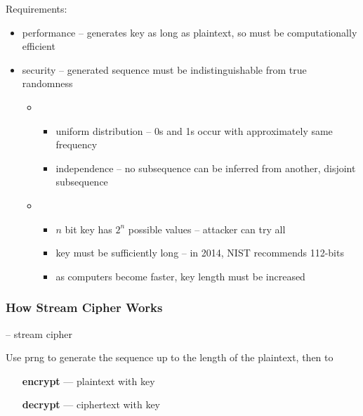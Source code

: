 \documentclass[draft]{article}
\begin{document}
Requirements:
\begin{itemize}[nosep]
    \item performance -- generates key as long as plaintext, so must be computationally efficient
    \item security -- generated sequence must be indistinguishable from true randomness
          \begin{itemize}
              \item {}
                    \begin{itemize}[nosep]
                        \item uniform distribution -- 0s and 1s occur with approximately same frequency
                        \item independence -- no subsequence can be inferred from another, disjoint subsequence
                    \end{itemize}
              \item {}
                    \begin{itemize}[nosep]
                        \item $n$ bit key has $2^n$ possible values -- attacker can try all
                        \item key must be sufficiently long -- in 2014, NIST recommends 112-bits
                        \item as computers become faster, key length must be increased
                    \end{itemize}
          \end{itemize}
\end{itemize}

\subsubsection*{How Stream Cipher Works}
 -- \glsdesc*{stream cipher}

Use \acrshort{prng} to generate the sequence up to the length of the plaintext, then to
\begin{itemize}[nosep, align=left, leftmargin=1in]
    \item[\textbf{encrypt} ---]  plaintext with key
    \item[\textbf{decrypt} ---]  ciphertext with key
\end{itemize}
\end{document}
